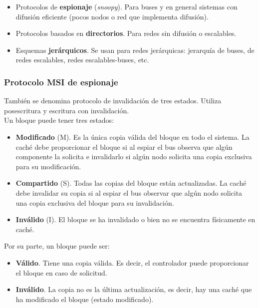 \documentclass[12pt,spanish]{article}
\begin{document}
\begin{itemize}
	\item Protocolos de \textbf{espionaje} (\textit{snoopy}). Para buses y en general sistemas con difusión eficiente (pocos nodos o red que implementa difusión).
	\item Protocolos basados en \textbf{directorios}. Para redes sin difusión o escalables.
	\item Esquemas \textbf{jerárquicos}. Se usan para redes jerárquicas: jerarquía de buses, de redes escalables, redes escalables-buses, etc.
\end{itemize}


\subsubsection{Protocolo MSI de espionaje}

También se denomina protocolo de invalidación de tres estados. Utiliza posescritura y escritura con invalidación. \\

Un bloque puede tener tres estados:
\begin{itemize}
	\item \textbf{Modificado} (M). Es la única copia válida del bloque en todo el sistema. La caché debe proporcionar el bloque si al espiar el bus observa que algún componente la solicita e invalidarlo si algún nodo solicita una copia exclusiva para su modificación.
	\item \textbf{Compartido} (S). Todas las copias del bloque están actualizadas. La caché debe invalidar su copia si al espiar el bus observar que algún nodo solicita una copia exclusiva del bloque para su invalidación.
	\item \textbf{Inválido} (I). El bloque se ha invalidado o bien no se encuentra físicamente en caché.
\end{itemize}

Por su parte, un bloque puede ser:

\begin{itemize}
	\item \textbf{Válido}. Tiene una copia válida. Es decir, el controlador puede proporcionar el bloque en caso de solicitud.
	\item \textbf{Inválido}. La copia no es la última actualización, es decir, hay una caché que ha modificado el bloque (estado modificado).
\end{itemize}
\end{document}
